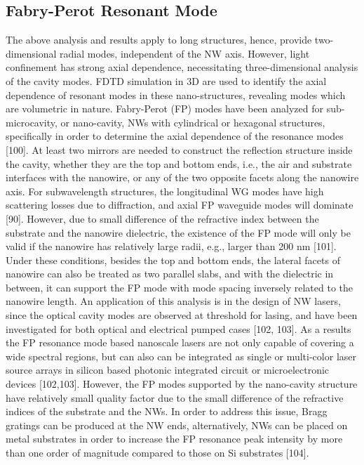 \subsection{Fabry-Perot Resonant Mode}
The above analysis and results apply to long structures, hence, provide two-dimensional radial modes, independent of the NW axis. However, light confinement has strong axial dependence, necessitating three-dimensional analysis of the cavity modes. FDTD simulation in 3D are used to identify the axial dependence of resonant modes in these nano-structures, revealing modes which are volumetric in nature.
Fabry-Perot (FP) modes have been analyzed for sub-microcavity, or nano-cavity, NWs with cylindrical or hexagonal structures, specifically in order to determine the axial dependence of the resonance modes [100]. At least two mirrors are needed to construct the reflection structure inside the cavity, whether they are the top and bottom ends, i.e., the air and substrate interfaces with the nanowire, or any of the two opposite facets along the nanowire axis. For subwavelength structures, the longitudinal WG modes have high scattering losses due to diffraction, and axial FP waveguide modes will dominate [90]. However, due to small difference of the refractive index between the substrate and the nanowire dielectric, the existence of the FP mode will only be valid if the nanowire has relatively large radii, e.g., larger than 200 nm [101]. Under these conditions, besides the top and bottom ends, the lateral facets of nanowire can also be treated as two parallel slabs, and with the dielectric in between, it can support the FP mode with mode spacing inversely related to the nanowire length. An application of this analysis is in the design of NW lasers, since the optical cavity modes are observed at threshold for lasing, and have been investigated for both optical and electrical pumped cases [102, 103]. As a results the FP resonance mode based nanoscale lasers are not only capable of covering a wide spectral regions, but can also can be integrated as single or multi-color laser source arrays in silicon based photonic integrated circuit or microelectronic devices [102,103]. However, the FP modes supported by the nano-cavity structure have relatively small quality factor due to the small difference of the refractive indices of the substrate and the NWs. In order to address this issue,  Bragg gratings can be produced at the NW ends, alternatively, NWs can be placed on metal substrates in order to increase the FP resonance peak intensity by more than one order of magnitude compared to those on Si substrates [104].
